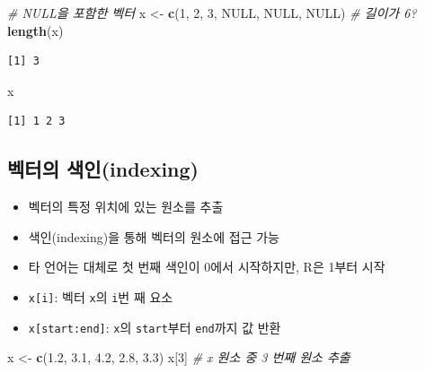 \documentclass[
  11pt,
]{krantz}
\newenvironment{Shaded}{\begin{snugshade}}{\end{snugshade}}
\newcommand{\CommentTok}[1]{\textcolor[rgb]{0.37,0.37,0.37}{\textit{#1}}}
\newcommand{\DecValTok}[1]{\textcolor[rgb]{0.06,0.06,0.06}{#1}}
\newcommand{\FloatTok}[1]{\textcolor[rgb]{0.06,0.06,0.06}{#1}}
\newcommand{\KeywordTok}[1]{\textcolor[rgb]{0.27,0.27,0.27}{\textbf{#1}}}
\newcommand{\NormalTok}[1]{#1}
\newcommand{\OtherTok}[1]{\textcolor[rgb]{0.37,0.37,0.37}{#1}}
\newcommand{\StringTok}[1]{\textcolor[rgb]{0.5,0.5,0.5}{#1}}
\providecommand{\tightlist}{%
  \setlength{\itemsep}{0pt}\setlength{\parskip}{0pt}}
\begin{document}
\begin{Shaded}
\begin{Highlighting}[]
\CommentTok{# NULL을 포함한 벡터 }
\NormalTok{x <-}\StringTok{ }\KeywordTok{c}\NormalTok{(}\DecValTok{1}\NormalTok{, }\DecValTok{2}\NormalTok{, }\DecValTok{3}\NormalTok{, }\OtherTok{NULL}\NormalTok{, }\OtherTok{NULL}\NormalTok{, }\OtherTok{NULL}\NormalTok{) }\CommentTok{# 길이가 6?}
\KeywordTok{length}\NormalTok{(x)}
\end{Highlighting}
\end{Shaded}

\begin{verbatim}
[1] 3
\end{verbatim}

\begin{Shaded}
\begin{Highlighting}[]
\NormalTok{x}
\end{Highlighting}
\end{Shaded}

\begin{verbatim}
[1] 1 2 3
\end{verbatim}

\normalsize

\hypertarget{vector-index}{%
\subsection{벡터의 색인(indexing)}\label{vector-index}}

\begin{itemize}
\tightlist
\item
  벡터의 특정 위치에 있는 원소를 추출\\
\item
  색인(indexing)을 통해 벡터의 원소에 접근 가능
\item
  타 언어는 대체로 첫 번째 색인이 0에서 시작하지만, R은 1부터 시작
\item
  \texttt{x{[}i{]}}: 벡터 \texttt{x}의 \texttt{i}번 째 요소
\item
  \texttt{x{[}start:end{]}}: \texttt{x}의 \texttt{start}부터 \texttt{end}까지 값 반환
\end{itemize}

\footnotesize

\begin{Shaded}
\begin{Highlighting}[]
\NormalTok{x <-}\StringTok{ }\KeywordTok{c}\NormalTok{(}\FloatTok{1.2}\NormalTok{, }\FloatTok{3.1}\NormalTok{, }\FloatTok{4.2}\NormalTok{, }\FloatTok{2.8}\NormalTok{, }\FloatTok{3.3}\NormalTok{)}
\NormalTok{x[}\DecValTok{3}\NormalTok{] }\CommentTok{# x 원소 중 3 번째 원소 추출}
\end{Highlighting}
\end{Shaded}
\end{document}
